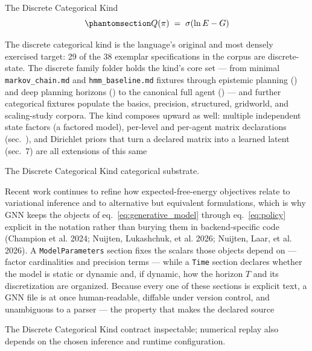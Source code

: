 \documentclass[
  ignorenonframetext,
]{beamer}
\begin{document}
\begin{frame}{The Discrete Categorical Kind}
\begin{equation}\protect\phantomsection\label{eq:policy}{
Q(\pi) \;=\; \sigma\!\left(\ln E - G\right)
}\end{equation}

The discrete categorical kind is the language's original and most
densely exercised target: 29 of the 38 exemplar specifications in the
corpus are discrete-state. The discrete family folder holds the kind's
core set --- from minimal \texttt{markov\_chain.md} and
\texttt{hmm\_baseline.md} fixtures through epistemic planning
() and deep planning horizons
() to the canonical full agent
() --- and further categorical fixtures
populate the basics, precision, structured, gridworld, and scaling-study
corpora. The kind composes upward as well: multiple independent state
factors (a factored model), per-level and per-agent matrix declarations
(sec.~), and Dirichlet priors that turn a
declared matrix into a learned latent
(sec.~7) are all extensions of this same
\end{frame}

\begin{frame}{The Discrete Categorical Kind}
categorical substrate.

Recent work continues to refine how expected-free-energy objectives
relate to variational inference and to alternative but equivalent
formulations, which is why GNN keeps the objects of
eq.~\ref{eq:generative_model} through eq.~\ref{eq:policy} explicit in
the notation rather than burying them in backend-specific code (Champion
et al. 2024; Nuijten, Lukashchuk, et al. 2026; Nuijten, Laar, et al.
2026). A \texttt{ModelParameters} section fixes the scalars those
objects depend on --- factor cardinalities and precision terms --- while
a \texttt{Time} section declares whether the model is static or dynamic
and, if dynamic, how the horizon \(T\) and its discretization are
organized. Because every one of these sections is explicit text, a GNN
file is at once human-readable, diffable under version control, and
unambiguous to a parser --- the property that makes the declared source
\end{frame}

\begin{frame}{The Discrete Categorical Kind}
contract inspectable; numerical replay also depends on the chosen
inference and runtime configuration.
\end{frame}
\end{document}
